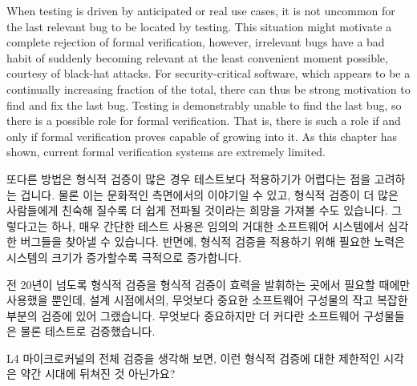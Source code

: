 When testing is driven by anticipated or real use cases, it is not
uncommon for the last relevant bug to be located by testing.
This situation might motivate a complete rejection of formal verification,
however, irrelevant bugs have a bad habit of suddenly becoming relevant
at the least convenient moment possible, courtesy of black-hat attacks.
For security-critical software, which appears to be a continually
increasing fraction of the total, there can thus be strong motivation
to find and fix the last bug.
Testing is demonstrably unable to find the last bug, so there is a
possible role for formal verification.
That is, there is such a role if and only if formal verification
proves capable of growing into it.
As this chapter has shown, current formal verification systems are
extremely limited.
\fi

또다른 방법은 형식적 검증이 많은 경우 테스트보다 적용하기가 어렵다는 점을
고려하는 겁니다.
물론 이는 문화적인 측면에서의 이야기일 수 있고, 형식적 검증이 더 많은
사람들에게 친숙해 질수록 더 쉽게 전파될 것이라는 희망을 가져볼 수도 있습니다.
그렇다고는 하나, 매우 간단한 테스트 사용은 임의의 거대한 소프트웨어 시스템에서
심각한 버그들을 찾아낼 수 있습니다.
반면에, 형식적 검증을 적용하기 위해 필요한 노력은 시스템의 크기가 증가할수록
극적으로 증가합니다.

전 20년이 넘도록 형식적 검증을 형식적 검증이 효력을 발휘하는 곳에서 필요할
때에만 사용했을 뿐인데, 설계 시점에서의, 무엇보다 중요한 소프트웨어 구성물의
작고 복잡한 부분의 검증에 있어 그랬습니다.
무엇보다 중요하지만 더 커다란 소프트웨어 구성물들은 물론 테스트로 검증했습니다.
\iffalse

Another approach is to consider that
formal verification is often much harder to use than is testing.
This is of course in part a cultural statement, and there is every reason
to hope that formal verification will be perceived to be easier as more
people become familiar with it.
That said, very simple test harnesses can find significant bugs in arbitrarily
large software systems.
In contrast, the effort required to apply formal verification seems to
increase dramatically as the system size increases.

I have nevertheless made occasional use of formal verification
for more than 20 years, playing to formal verification's strengths,
namely design-time verification of small complex portions of the overarching
software construct.
The larger overarching software construct is of course validated by testing.
\fi

\QuickQuiz{}
	L4 마이크로커널의 전체 검증을 생각해 보면, 이런 형식적 검증에 대한
	제한적인 시각은 약간 시대에 뒤쳐진 것 아닌가요?
	\iffalse


